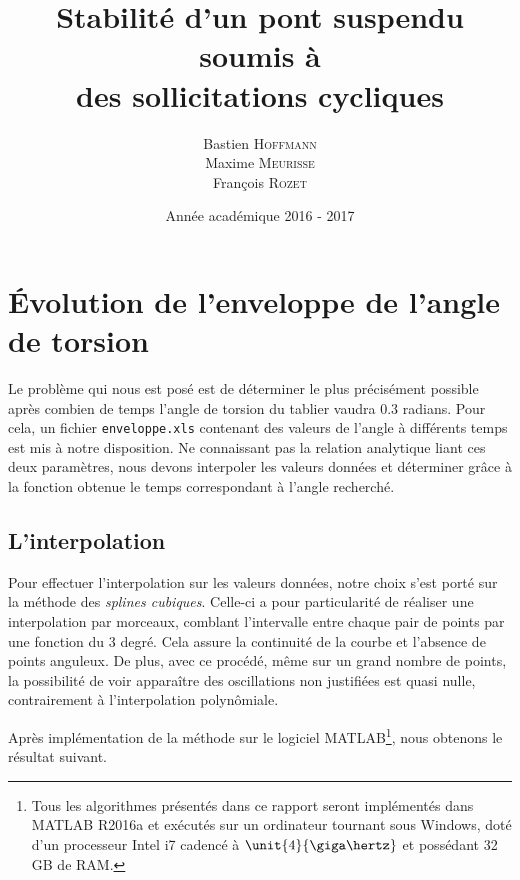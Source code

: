 \documentclass[a4paper, 12pt]{article}
\title{Stabilité d'un pont suspendu soumis à \\[0.3em] des sollicitations cycliques}
\author{
	Bastien \textsc{Hoffmann}\\
	Maxime \textsc{Meurisse}\\
	François \textsc{Rozet}\\
}
\date{Année académique 2016 - 2017}
\begin{document}
	
	\tableofcontents
	\newpage
	\section{Évolution de l’enveloppe de l’angle de torsion}
	Le problème qui nous est posé est de déterminer le plus précisément possible après combien de temps l'angle de torsion du tablier vaudra $\num{0.3}$ radians. Pour cela, un fichier \texttt{enveloppe.xls} contenant des valeurs de l'angle à différents temps est mis à notre disposition. Ne connaissant pas la relation analytique liant ces deux paramètres, nous devons interpoler les valeurs données et déterminer grâce à la fonction obtenue le temps correspondant à l'angle recherché.
	\subsection{L'interpolation}
	Pour effectuer l'interpolation sur les valeurs données, notre choix s'est porté sur la méthode des \textit{splines cubiques}. Celle-ci a pour particularité de réaliser une interpolation par morceaux, comblant l'intervalle entre chaque pair de points par une fonction du 3 degré. Cela assure la continuité de la courbe et l'absence de points anguleux. De plus, avec ce procédé, même sur un grand nombre de points, la possibilité de voir apparaître des oscillations non justifiées est quasi nulle, contrairement à l'interpolation polynômiale.\par
	Après implémentation de la méthode sur le logiciel \textsc{MATLAB}\footnote{Tous les algorithmes présentés dans ce rapport seront implémentés dans \textsc{MATLAB} R2016a et exécutés sur un ordinateur tournant sous Windows, doté d'un processeur Intel i7 cadencé à $\unit{4}{\giga\hertz}$ et possédant 32 GB de RAM.}, nous obtenons le résultat suivant.
\end{document}
